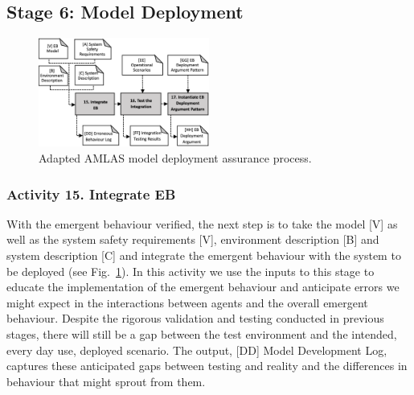 \documentclass[lettersize,journal]{IEEEtran}
\begin{document}



\subsection{Stage 6: Model Deployment} \label{framework-stage6}
\begin{figure}
	\centering
	\includegraphics[width=0.5\textwidth]{figures/amlas-a-stage6_v2.png}%
	\caption{Adapted AMLAS model deployment assurance process.}
	\label{amlas-a-stage6}
\end{figure}

\subsubsection*{Activity 15. Integrate EB}

With the emergent behaviour verified, the next step is to take the model [V] as well as the system safety requirements [V], environment description [B] and system description [C] and integrate the emergent behaviour with the system to be deployed (see Fig.~\ref{amlas-a-stage6}). In this activity we use the inputs to this stage to educate the implementation of the emergent behaviour and anticipate errors we might expect in the interactions between agents and the overall emergent behaviour. Despite the rigorous validation and testing conducted in previous stages, there will still be a gap between the test environment and the intended, every day use, deployed scenario. The output, [DD] Model Development Log, captures these anticipated gaps between testing and reality and the differences in behaviour that might sprout from them.
\end{document}
